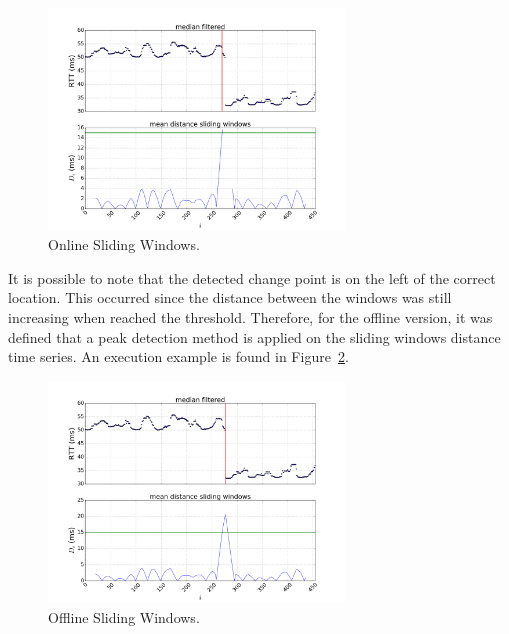 \begin{figure}[H]
    \centering
    \includegraphics[width=0.7\textwidth]{./figures/change_point_detection/sliding_windows_online/id100_serverNHODTCSRV04_mac64:66:B3:A6:B3:22_dtstart2016-07-01_dtend2016-07-11.png}
    \caption{Online Sliding Windows.}
\label{fig:sliding_windows_online}
\end{figure}%

It is possible to note that the detected change point is on the left of the
correct location.
This occurred since the distance between the windows was still
increasing when reached the threshold. Therefore, for the offline
version, it was defined that a peak detection method is applied on
the sliding windows distance time series.
An execution example is found in
Figure~\ref{fig:sliding_windows_offline}.

\begin{figure}[H]
    \centering
    \includegraphics[width=0.7\textwidth]{./figures/change_point_detection/sliding_windows_offline/id100_serverNHODTCSRV04_mac64:66:B3:A6:B3:22_dtstart2016-07-01_dtend2016-07-11.png}
    \caption{Offline Sliding Windows.}
\label{fig:sliding_windows_offline}
\end{figure}%

